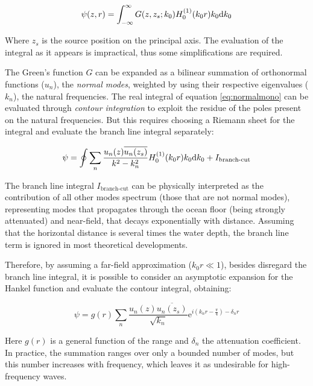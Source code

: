 \begin{equation}
 \label{eq:normalmono}
 \psi(z,r) = \int_{-\infty}^{\infty} G(z,z_s;k_0)H_0^{(1)}(k_0r)k_0\mathrm{d} k_0
 \end{equation}
 
Where $z_s$ is the source position on the principal axis. The evaluation of the
integral as it appears is impractical, thus some simplifications are required.

The Green's function $G$ can be expanded as a bilinear summation of orthonormal
functions ($u_ n$), the \textit{normal modes}\cite{baker2003green}, weighted by
using their respective eigenvalues ($k_n$), the natural frequencies. The real
integral of equation \ref{eq:normalmono} can be evaluated through \textit{contour
integration} to exploit the residue of the poles present on the natural
frequencies. But this requires choosing a Riemann
sheet for the integral and evaluate the branch line integral
separately\cite{jensen2011computational,worzel1948propagation}:

\begin{equation}
\psi = \oint \sum_n{\frac{u_n(z)\overline{u_n(z_s)}}{k^2 -
k_n^2}H_0^{(1)}(k_0r)k_0\mathrm{d} k_0} + I_{\text{branch-cut}}
\end{equation}

The branch line integral $I_{\text{branch-cut}}$ can be physically interpreted
as the contribution of all other modes spectrum (those that are not
normal modes), representing modes that propagates through the ocean floor
(being strongly attenuated) and near-field, that decays exponentially with
distance. Assuming that the horizontal distance is several times the water
depth, the branch line term is ignored in most theoretical developments.

Therefore, by assuming a far-field approximation ($k_0r \ll 1$), besides
disregard the branch line integral, it is possible to consider an asymptotic expansion for the
Hankel function and evaluate the contour integral, obtaining\cite{Etter2013}:

\begin{equation}
\label{eq:normalsolution}
\psi =
g(r)\sum_n{\frac{u_n(z)\overline{u_n(z_s)}}{\sqrt{k_n}}\mathrm{e}^{i(k_nr-\tfrac{\pi}{4})-\delta_nr}}
\end{equation}

Here $g(r)$ is a general function of the range and $\delta_n$ the attenuation
coefficient. In practice, the summation ranges over only a bounded number of
modes, but this number increases with frequency, which leaves it as undesirable
for high-frequency waves. 

